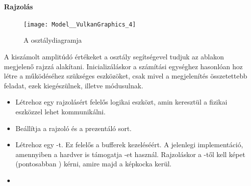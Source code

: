 \paragraph{Rajzol\'as}
\begin{figure}[h]
	\texttt{[image: Model\_\_VulkanGraphics\_4]}
	\centering
	\caption{A  oszt\'alydiagramja}
\end{figure}
A kisz\'amolt amplit\'ud\'o \'ert\'ekeket a  oszt\'aly seg\'its\'egevel tudjuk az ablakon megjelen\H o rajzz\'a alak\'itani. 
Inicializ\'al\'askor a sz\'am\'it\'asi egys\'eghez hasonl\'oan hoz l\'etre a m\H uk\"od\'es\'ehez sz\"uks\'eges eszk\"oz\"oket, csak mivel a megjelen\'it\'es \"osszetettebb feladat, ezek kieg\'esz\"ulnek, illetve m\'odusulnak.
\begin{itemize}
	\item L\'etrehoz egy rajzol\'as\'ert felel\H os logikai eszk\"ozt, amin kereszt\"ul a fizikai eszk\"ozzel lehet kommunik\'alni.
	\item Be\'all\'itja a rajzol\'o \'es a prezent\'al\'o sort.
	\item L\'etrehoz egy -t. Ez felel\H os a bufferek kezel\'es\'e\'ert. A jelenlegi implement\'aci\'o, amennyiben a hardver is t\'amogatja -et haszn\'al. Rajzol\'askor a -t\H ol kell k\'epet (pontosabban ) k\'erni, amire majd a k\'epkocka ker\"ul.
	\item 
\end{itemize}